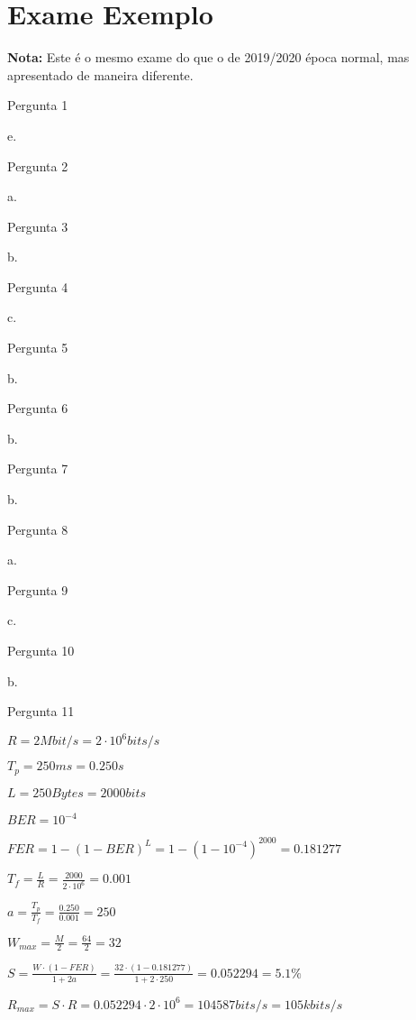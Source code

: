 \documentclass[addpoints]{exam}
\begin{document}
\section*{Exame Exemplo}

\textbf{Nota:} Este é o mesmo exame do que o de 2019/2020 época normal, mas apresentado de maneira diferente.

\begin{questions}

\question Pergunta 1

e.

\question Pergunta 2

a.

\question Pergunta 3

b.

\question Pergunta 4

c.

\question Pergunta 5

b.

\question Pergunta 6

b. 

\question Pergunta 7

b.

\question Pergunta 8

a. 

\question Pergunta 9

c.

\question Pergunta 10

b.

\question Pergunta 11

$R = 2 Mbit/s = 2 \cdot 10^{6} bits/s$

$T_{p} = 250 ms = 0.250 s$   

$L = 250 Bytes = 2000 bits$

$BER = 10^{-4}$

$
FER = 1 - (1 - BER)^{L} 
        = 1 - (1 - 10^{-4})^{2000}
        = 0.181277
$

$
T_{f} = \frac{L}{R}
      = \frac{2000}{2 \cdot 10^{6}}
      = 0.001
$

$
a = \frac{T_{p}}{T_{f}}
  = \frac{0.250}{0.001}
  = 250
$

$
W_{max} = \frac{M}{2} 
        = \frac{64}{2}
        = 32
$

$
S = \frac{W \cdot (1 - FER)}{1 + 2a}
  = \frac{32 \cdot (1 - 0.181277)}{1 + 2 \cdot 250}
  = 0.052294
  = 5.1 \%
$

$
R_{max} = S \cdot R
        = 0.052294 \cdot 2 \cdot 10^{6}
        = 104587 bits/s
        = 105 kbits/s
$


\end{questions}
\end{document}
